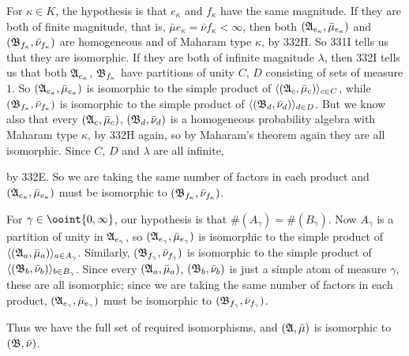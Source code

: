 { For $\kappa\in K$, the hypothesis is that $e_{\kappa}$
and $f_{\kappa}$ have the same magnitude.   If they are both of finite
magnitude, that is, $\bar\mu e_{\kappa}=\bar\nu f_{\kappa}<\infty$, then
both $(\frak A_{e_{\kappa}},\bar\mu_{e_{\kappa}})$ and
$(\frak B_{f_{\kappa}},\bar\nu_{f_{\kappa}})$ are homogeneous and of
Maharam type $\kappa$, by 332H.   So 331I tells us that they are
isomorphic.   If they are both of infinite magnitude $\lambda$, then
332I tells us that both $\frak A_{e_{\kappa}}$, $\frak B_{f_{\kappa}}$
have partitions of unity $C$, $D$ consisting of sets of measure $1$.
So $(\frak A_{e_{\kappa}},\bar\mu_{e_{\kappa}})$ is isomorphic to the
simple product of $\langle(\frak A_c,\bar\mu_c)\rangle_{c\in C}$, while
$(\frak B_{f_{\kappa}},\bar\nu_{f_{\kappa}})$ is isomorphic to the
simple product of
$\langle(\frak B_d,\bar\nu_d)\rangle_{d\in D}$.  But we know also that
every $(\frak A_c,\bar\mu_c)$, $(\frak B_d,\bar\nu_d)$ is a homogeneous
probability
algebra with Maharam type $\kappa$, by 332H again, so by Maharam's theorem
again they are all isomorphic.   Since $C$, $D$ and $\lambda$ are all
infinite,


\noindent by 332E.   So we are taking the same number of factors in each
product and $(\frak A_{e_{\kappa}},\bar\mu_{e_{\kappa}})$ must be
isomorphic
to $(\frak B_{f_{\kappa}},\bar\nu_{f_{\kappa}})$.

\medskip

 For $\gamma\in\ooint{0,\infty}$, our hypothesis is that
$\#(A_{\gamma})=\#(B_{\gamma})$.   Now $A_{\gamma}$ is a partition of
unity in $\frak A_{e_{\gamma}}$, so
$(\frak A_{e_{\gamma}},\bar\mu_{e_{\gamma}})$ is isomorphic to the
simple product of
$\langle(\frak A_a,\bar\mu_a)\rangle_{a\in A_{\gamma}}$.   Similarly,
$(\frak B_{f_{\gamma}},\bar\nu_{f_{\gamma}})$ is isomorphic to the
simple product of
$\langle(\frak B_b,\bar\nu_b)\rangle_{b\in B_{\gamma}}$.
Since every $(\frak A_a,\bar\mu_a)$, $(\frak B_b,\bar\nu_b)$ is just a
simple atom of
measure $\gamma$, these are all isomorphic;  since we are taking the
same number of factors in each product,
$(\frak A_{e_{\gamma}},\bar\mu_{e_{\gamma}})$ must be isomorphic to
$(\frak B_{f_{\gamma}},\bar\nu_{f_{\gamma}})$.

\medskip

 Thus we have the full set of required isomorphisms, and
$(\frak A,\bar\mu)$ is isomorphic to $(\frak B,\bar\nu)$.
}%

